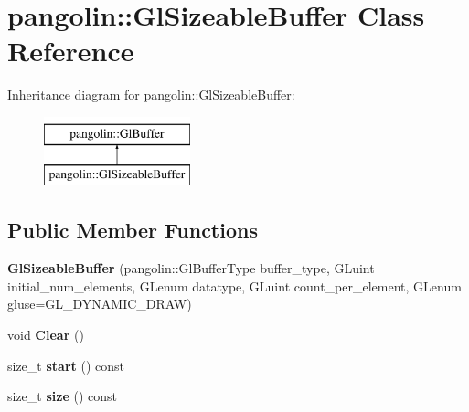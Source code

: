 \hypertarget{classpangolin_1_1_gl_sizeable_buffer}{}\section{pangolin\+:\+:Gl\+Sizeable\+Buffer Class Reference}
\label{classpangolin_1_1_gl_sizeable_buffer}
Inheritance diagram for pangolin\+:\+:Gl\+Sizeable\+Buffer\+:\begin{figure}[H]
\begin{center}
\leavevmode
\includegraphics[height=2.000000cm]{classpangolin_1_1_gl_sizeable_buffer}
\end{center}
\end{figure}
\subsection*{Public Member Functions}
\begin{DoxyCompactItemize}
\item 
{\bfseries Gl\+Sizeable\+Buffer} (pangolin\+::\+Gl\+Buffer\+Type buffer\+\_\+type, G\+Luint initial\+\_\+num\+\_\+elements, G\+Lenum datatype, G\+Luint count\+\_\+per\+\_\+element, G\+Lenum gluse=G\+L\+\_\+\+D\+Y\+N\+A\+M\+I\+C\+\_\+\+D\+R\+AW)\hypertarget{classpangolin_1_1_gl_sizeable_buffer_ae85fb730a37da1481f389aa5116d5dd1}{}\label{classpangolin_1_1_gl_sizeable_buffer_ae85fb730a37da1481f389aa5116d5dd1}

\item 
void {\bfseries Clear} ()\hypertarget{classpangolin_1_1_gl_sizeable_buffer_a9ec9de9659f16f11c204635599f1fea5}{}\label{classpangolin_1_1_gl_sizeable_buffer_a9ec9de9659f16f11c204635599f1fea5}

\item 
size\+\_\+t {\bfseries start} () const \hypertarget{classpangolin_1_1_gl_sizeable_buffer_a4c4493fa7e7f7c53f9f91ffc17887c65}{}\label{classpangolin_1_1_gl_sizeable_buffer_a4c4493fa7e7f7c53f9f91ffc17887c65}

\item 
size\+\_\+t {\bfseries size} () const \hypertarget{classpangolin_1_1_gl_sizeable_buffer_aaa59deeffe8d5204673986ceeea069c6}{}\label{classpangolin_1_1_gl_sizeable_buffer_aaa59deeffe8d5204673986ceeea069c6}

\end{DoxyCompactItemize}
